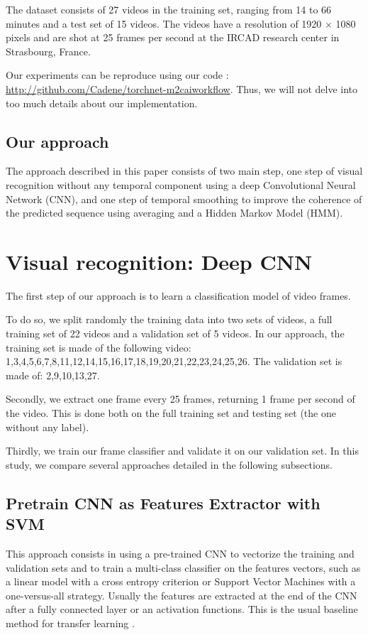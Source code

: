 \documentclass[10pt,twocolumn,letterpaper]{article}
\begin{document}
The dataset consists of 27 videos in the training set, ranging from 14 to 66
minutes and a test set of 15 videos. The videos have a resolution of 1920 $\times$
1080 pixels and are shot at 25 frames per second at the IRCAD research center in
Strasbourg, France.

Our experiments can be reproduce using our code : \url{http://github.com/Cadene/torchnet-m2caiworkflow}. Thus, we will not delve into too much details about our implementation.

\subsection{Our approach}

The approach described in this paper consists of two main step, one step of visual recognition without any temporal component using a deep Convolutional Neural Network (CNN), and one step of temporal smoothing to improve the coherence of the predicted sequence using averaging and a Hidden Markov Model (HMM).

\section{Visual recognition: Deep CNN}

The first step of our approach is to learn a classification model of video frames.

To do so, we split randomly the training data into two sets of videos, a full training set of 22 videos and a validation set of 5 videos. In our approach, the training set is made of the following video: 1,3,4,5,6,7,8,11,12,14,15,16,17,18,19,20,21,22,23,24,25,26. The validation set is made of: 2,9,10,13,27.

Secondly, we extract one frame every 25 frames, returning 1 frame per second of the video. This is done both on the full training set and testing set (the one without any label).

Thirdly, we train our frame classifier and validate it on our validation set. In this study, we compare several approaches detailed in the following subsections.

\subsection{Pretrain CNN as Features Extractor with SVM}

This approach consists in using a pre-trained CNN to vectorize the training and validation sets and to train a multi-class classifier on the features vectors, such as a linear model with a cross entropy criterion or Support Vector Machines with a one-versus-all strategy.
Usually the features are extracted at the end of the CNN after a fully connected layer or an activation functions. This is the usual baseline method for transfer learning \cite{simonyan2014very}.
\end{document}
